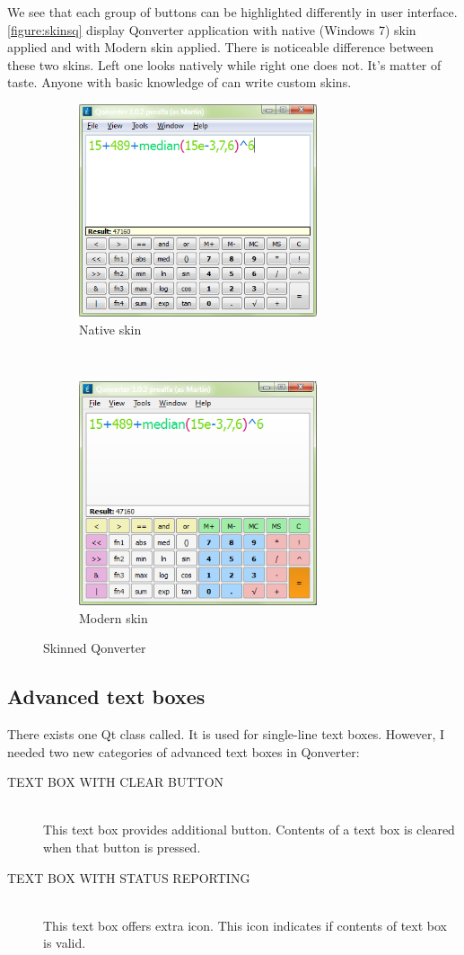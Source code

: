 We see that each group of buttons can be highlighted differently in user interface. \autoref{figure:skinsq} display Qonverter application with native (Windows 7) skin applied and with Modern skin applied. There is noticeable difference between these two skins. Left one looks natively while right one does not. It's matter of taste. Anyone with basic knowledge of  can write custom skins.

\begin{figure}[ht]
\centering
\begin{subfigure}[b]{0.48\textwidth}
\centering
\includegraphics[width=7cm]{graphics/real-world/00-qon-native}
\caption{Native skin}
\end{subfigure}
~
\begin{subfigure}[b]{0.48\textwidth}
\centering
\includegraphics[width=7cm]{graphics/real-world/00-qon-modern}
\caption{Modern skin}
\end{subfigure}
\caption{Skinned Qonverter}\label{figure:skinsq}
\end{figure}

\subsection{Advanced text boxes}
There exists one Qt class called. It is used for single-line text boxes. However, I needed two new categories of advanced text boxes in Qonverter:
\begin{description}
\item[TEXT BOX WITH CLEAR BUTTON] \hfill \\
This text box provides additional button. Contents of a text box is cleared when that button is pressed.
\item[TEXT BOX WITH STATUS REPORTING] \hfill \\
This text box offers extra icon. This icon indicates if contents of text box is valid.
\end{description}


